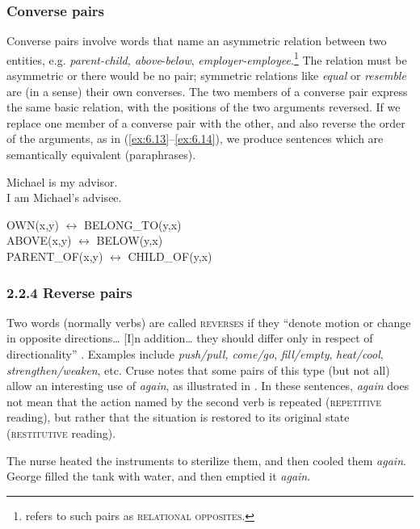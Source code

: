 \subsubsection{Converse pairs}\label{sec:} %

Converse pairs involve words that name an asymmetric relation between two entities, e.g. \textit{parent-child, above}-\textit{below}, \textit{employer-employee}.\footnote{\citet[231]{Cruse1986} refers to such pairs as \textsc{relational} \textsc{opposites}.} The relation must be asymmetric or there would be no pair; symmetric relations like \textit{equal} or \textit{resemble} are (in a sense) their own converses. The two members of a converse pair express the same basic relation, with the positions of the two arguments reversed. If we replace one member of a converse pair with the other, and also reverse the order of the arguments, as in (\ref{ex:6.13}--\ref{ex:6.14}), we produce sentences which are semantically equivalent (paraphrases).


\ea \label{ex:6.13}
\ea Michael is my advisor.\\
\ex I am Michael’s advisee.
                       \z
\z

\ea \label{ex:6.14}
OWN(x,y) $\leftrightarrow $ BELONG\_TO(y,x)\\
ABOVE(x,y) $\leftrightarrow $ BELOW(y,x)\\
PARENT\_OF(x,y) $\leftrightarrow $ CHILD\_OF(y,x)
\z

\subsubsection{2.2.4 Reverse pairs}\label{sec:}

Two words (normally verbs) are called \textsc{reverses} if they “denote motion or change in opposite directions… [I]n addition… they should differ only in respect of directionality” \citep[226]{Cruse1986}. Examples include \textit{push/pull, come/go}, \textit{fill/empty}, \textit{heat/cool}, \textit{strengthen/weaken}, etc. Cruse notes that some pairs of this type (but not all) allow an interesting use of \textit{again}, as illustrated in . In these sentences, \textit{again} does not mean that the action named by the second verb is repeated (\textsc{repetitive} reading), but rather that the situation is restored to its original state (\textsc{restitutive} reading).


\ea \label{ex:6.15}
\ea The nurse heated the instruments to sterilize them, and then cooled them \textit{again}.\\
\ex George filled the tank with water, and then emptied it \textit{again}.
                       \z
\z

